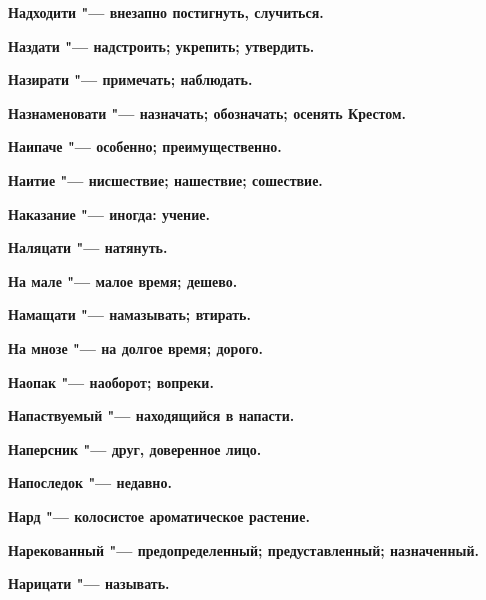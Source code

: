 \bfseries Надходити \normalfont{} "--- внезапно постигнуть, случиться. 




\bfseries Наздати \normalfont{} "--- надстроить; укрепить; утвердить. 




\bfseries Назирати \normalfont{} "--- примечать; наблюдать. 




\bfseries Назнаменовати \normalfont{} "--- назначать; обозначать; осенять Крестом. 




\bfseries Наипаче \normalfont{} "--- особенно; преимущественно. 




\bfseries Наитие \normalfont{} "--- нисшествие; нашествие; сошествие. 




\bfseries Наказание \normalfont{} "--- иногда: учение. 




\bfseries Наляцати \normalfont{} "--- натянуть. 




\bfseries На мале \normalfont{} "--- малое время; дешево. 




\bfseries Намащати \normalfont{} "--- намазывать; втирать. 




\bfseries На мнозе \normalfont{} "--- на долгое время; дорого. 




\bfseries Наопак \normalfont{} "--- наоборот; вопреки. 




\bfseries Напаствуемый \normalfont{} "--- находящийся в напасти. 




\bfseries Наперсник \normalfont{} "--- друг, доверенное лицо. 




\bfseries Напоследок \normalfont{} "--- недавно. 




\bfseries Нард \normalfont{} "--- колосистое ароматическое растение. 




\bfseries Нарекованный \normalfont{} "--- предопределенный; предуставленный; назначенный. 




\bfseries Нарицати \normalfont{} "--- называть. 




